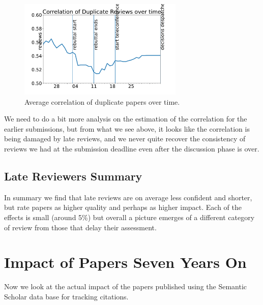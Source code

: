 \begin{figure}[htb]
\includegraphics[width=0.70\textwidth]{diagrams/neurips/correlation-duplicate-reviews.pdf}


\caption{Average correlation of duplicate papers over time.}
\label{correlation-duplicate-reviews}
\end{figure}

We need to do a bit more analysis on the estimation of the correlation
for the earlier submissions, but from what we see above, it looks like
the correlation is being damaged by late reviews, and we never quite
recover the consistency of reviews we had at the submission deadline
even after the discussion phase is over.

\hypertarget{late-reviewers-summary}{%
\subsection{Late Reviewers Summary}\label{late-reviewers-summary}}

In summary we find that late reviews are on average less confident and
shorter, but rate papers as higher quality and perhaps as higher impact.
Each of the effects is small (around 5\%) but overall a picture emerges
of a different category of review from those that delay their
assessment.

\hypertarget{impact-of-papers-seven-years-on}{%
\section{Impact of Papers Seven Years
On}\label{impact-of-papers-seven-years-on}}

\begin{flushright}
\end{flushright}

Now we look at the actual impact of the papers published using the
Semantic Scholar data base for tracking citations.

